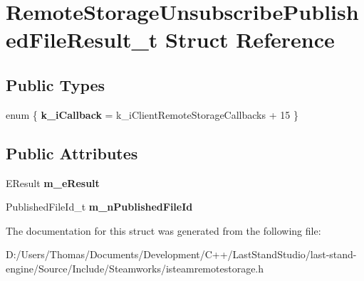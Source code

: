 \hypertarget{structRemoteStorageUnsubscribePublishedFileResult__t}{}\section{Remote\+Storage\+Unsubscribe\+Published\+File\+Result\+\_\+t Struct Reference}
\label{structRemoteStorageUnsubscribePublishedFileResult__t}
\subsection*{Public Types}
\begin{DoxyCompactItemize}
\item 
\hypertarget{structRemoteStorageUnsubscribePublishedFileResult__t_a695b93946f4338b2492d9e354f3e153c}{}enum \{ {\bfseries k\+\_\+i\+Callback} = k\+\_\+i\+Client\+Remote\+Storage\+Callbacks + 15
 \}\label{structRemoteStorageUnsubscribePublishedFileResult__t_a695b93946f4338b2492d9e354f3e153c}

\end{DoxyCompactItemize}
\subsection*{Public Attributes}
\begin{DoxyCompactItemize}
\item 
\hypertarget{structRemoteStorageUnsubscribePublishedFileResult__t_af604e72512d994306ad11cd5cd63aeff}{}E\+Result {\bfseries m\+\_\+e\+Result}\label{structRemoteStorageUnsubscribePublishedFileResult__t_af604e72512d994306ad11cd5cd63aeff}

\item 
\hypertarget{structRemoteStorageUnsubscribePublishedFileResult__t_af37123e1353f13f9c183b58cffd8c827}{}Published\+File\+Id\+\_\+t {\bfseries m\+\_\+n\+Published\+File\+Id}\label{structRemoteStorageUnsubscribePublishedFileResult__t_af37123e1353f13f9c183b58cffd8c827}

\end{DoxyCompactItemize}


The documentation for this struct was generated from the following file\+:\begin{DoxyCompactItemize}
\item 
D\+:/\+Users/\+Thomas/\+Documents/\+Development/\+C++/\+Last\+Stand\+Studio/last-\/stand-\/engine/\+Source/\+Include/\+Steamworks/isteamremotestorage.\+h\end{DoxyCompactItemize}
